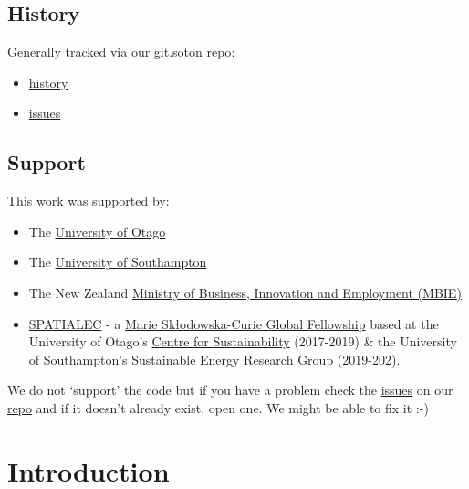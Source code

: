 \documentclass[]{article}
\providecommand{\tightlist}{%
  \setlength{\itemsep}{0pt}\setlength{\parskip}{0pt}}
\begin{document}
\subsection{History}\label{history}

Generally tracked via our git.soton
\href{https://git.soton.ac.uk/ba1e12/nzGREENGrid}{repo}:

\begin{itemize}
\tightlist
\item
  \href{https://git.soton.ac.uk/ba1e12/nzGREENGrid/commits/master}{history}
\item
  \href{https://git.soton.ac.uk/ba1e12/nzGREENGrid/issues}{issues}
\end{itemize}

\subsection{Support}\label{support}

This work was supported by:

\begin{itemize}
\tightlist
\item
  The \href{https://www.otago.ac.nz/}{University of Otago}
\item
  The \href{https://www.southampton.ac.uk/}{University of Southampton}
\item
  The New Zealand \href{http://www.mbie.govt.nz/}{Ministry of Business,
  Innovation and Employment (MBIE)}
\item
  \href{http://www.energy.soton.ac.uk/tag/spatialec/}{SPATIALEC} - a
  \href{http://ec.europa.eu/research/mariecurieactions/about-msca/actions/if/index_en.htm}{Marie
  Skłodowska-Curie Global Fellowship} based at the University of Otago's
  \href{http://www.otago.ac.nz/centre-sustainability/staff/otago673896.html}{Centre
  for Sustainability} (2017-2019) \& the University of Southampton's
  Sustainable Energy Research Group (2019-202).
\end{itemize}

We do not `support' the code but if you have a problem check the
\href{https://git.soton.ac.uk/ba1e12/nzGREENGrid/issues}{issues} on our
\href{https://git.soton.ac.uk/ba1e12/nzGREENGrid}{repo} and if it
doesn't already exist, open one. We might be able to fix it :-)

\section{Introduction}\label{introduction}
\end{document}
